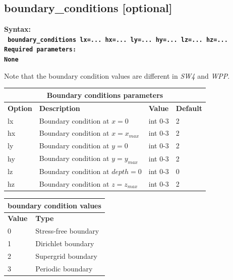 \documentclass[11pt]{report}
\begin{document}
\subsection{boundary\_conditions [optional]}
\label{keyword:boundary_conditions}
\begin{flushleft}\bf
Syntax:\\
\tt
boundary\_conditions lx=... hx=... ly=... hy=... lz=... hz=...
\\
\bf Required parameters:\\
\rm
None
\end{flushleft}
Note that the boundary condition values are different in \emph{SW4} and \emph{WPP}.
\begin{center}
\begin{tabular}{|l|p{10cm}|l|l|} \hline
\multicolumn{4}{|c|}{\bf Boundary conditions parameters}\\ \hline
\bf{Option} & \bf{Description} & \bf{Value} & \bf{Default} \\ \hline \hline
lx & Boundary condition at $x=0$      & int 0-3 & 2 \\ \hline
hx & Boundary condition at $x=x_{max}$ & int 0-3 & 2 \\ \hline 
ly & Boundary condition at $y=0$      & int 0-3 & 2 \\ \hline
hy & Boundary condition at $y=y_{max}$ & int 0-3 & 2 \\ \hline 
lz & Boundary condition at $depth=0 $ & int 0-3 & 0 \\ \hline 
hz & Boundary condition at $z=z_{max}$ & int 0-3 & 2 \\ \hline
\end{tabular}
\end{center}

\begin{center}
\begin{tabular}{|l|p{10cm}|} \hline
\multicolumn{2}{|c|}{\bf boundary condition values }\\ \hline
\bf{Value} & \bf{Type} \\ \hline \hline
0 & Stress-free boundary   \\ \hline
1 & Dirichlet boundary  \\ \hline
2 & Supergrid boundary         \\ \hline
3 & Periodic boundary         \\ \hline
\end{tabular}
\end{center}
\end{document}
